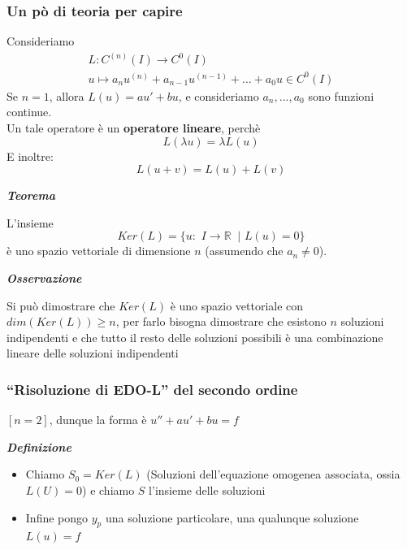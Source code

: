 \documentclass{article}
\theoremstyle{definition}
\newcommand{\R}{\mathbb{R}}
\newcommand{\virgolette}[1]{``#1''}
\begin{document}
\subsubsection{Un pò di teoria per capire}
Consideriamo
\begin{align}
    L: C^{(n)}(I) \to C^0(I) \\
    u \mapsto a_nu^{(n)}+a_{n-1}u^{(n-1)}+...+a_0u \in C^0(I)
\end{align}
Se $n=1$, allora $L(u)=au'+bu$, e consideriamo $a_n,...,a_0$ sono funzioni continue.
\\
Un tale operatore è un \textbf{operatore lineare}, perchè 
\begin{equation}
    L(\lambda u)= \lambda L(u)
\end{equation}
E inoltre:
\begin{equation}
    L(u+v)=L(u)+L(v)
\end{equation}
\begin{center}
    \textbf{\textit{Teorema}}
\end{center}
L'insieme
\begin{equation}
    Ker(L)= \{u: \,\, I \to \R \,\,\ | \,\, L(u)=0\}
\end{equation}
è uno spazio vettoriale di dimensione $n$ (assumendo che $a_n \neq 0$).
\begin{center}
    \textbf{\textit{Osservazione}}
\end{center}
Si può dimostrare che $Ker(L)$ è uno spazio vettoriale con $dim(Ker(L)) \geqslant n$, per farlo bisogna dimostrare che esistono $n$ soluzioni indipendenti e che tutto il resto delle soluzioni possibili è una combinazione lineare delle soluzioni indipendenti

\subsubsection{\virgolette{Risoluzione di EDO-L} del secondo ordine}
$[n=2]$, dunque la forma è $u''+au'+bu=f$
\\
\begin{center}
    \textbf{\textit{Definizione}}
\end{center}
\begin{itemize}
    \item Chiamo $S_0=Ker(L)$ (Soluzioni dell'equazione omogenea associata, ossia $L(U)=0$) e chiamo $S$ l'insieme delle soluzioni
    \item Infine pongo $y_p$ una soluzione particolare, una qualunque soluzione $L(u)=f$
\end{itemize}
    
\end{document}

